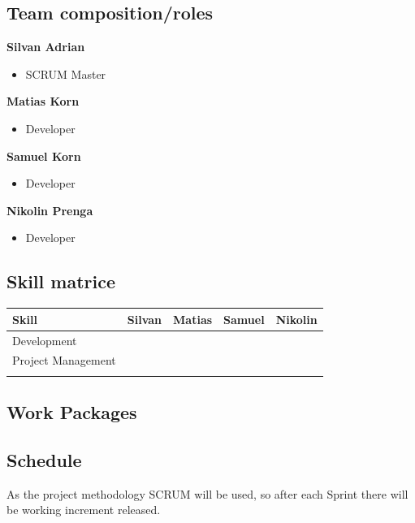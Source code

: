 \documentclass{article}
\begin{document}
\subsection{Team composition/roles}
\textbf{Silvan Adrian}
\begin{itemize}
	\item SCRUM Master %
\end{itemize}
\textbf{Matias Korn}
\begin{itemize}
	\item Developer
\end{itemize}
\textbf{Samuel Korn}
\begin{itemize}
	\item Developer
\end{itemize}
\textbf{Nikolin Prenga}
\begin{itemize}
	\item Developer
\end{itemize}

\subsection{Skill matrice}
\begin{table}[htb!]
\begin{tabular}{lllll}
 \textbf{Skill}  & \textbf{Silvan} & \textbf{Matias} & \textbf{Samuel} & \textbf{Nikolin} \\
\hline
Development       &                 &                   &                   &                  \\
Project Management &                 &                   &                   &                  \\
                  &                 &                   &                   &                 
\end{tabular}
\end{table}

\subsection{Work Packages}

\subsection{Schedule}
As the project methodology SCRUM will be used, so after each Sprint there will be  working increment released.
\end{document}
